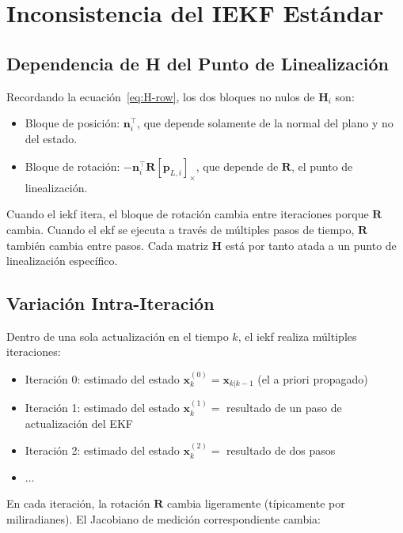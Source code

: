 \section{Inconsistencia del IEKF Estándar}
\label{sec:fej-inconsistencia}

\subsection{Dependencia de H del Punto de Linealización}
\label{sec:fej-dependencia-H}

Recordando la ecuación~\eqref{eq:H-row}, los dos bloques no nulos de $\mathbf{H}_i$
son:

\begin{itemize}
    \item Bloque de posición: $\mathbf{n}_i^\top$, que depende solamente de la
    normal del plano y no del estado.
    \item Bloque de rotación: $-\mathbf{n}_i^\top \mathbf{R} [\mathbf{p}_{L,i}]_\times$,
    que depende de $\mathbf{R}$, el punto de linealización.
\end{itemize}

Cuando el \gls{iekf} itera, el bloque de rotación cambia entre iteraciones porque
$\mathbf{R}$ cambia. Cuando el \gls{ekf} se ejecuta a través de múltiples pasos
de tiempo, $\mathbf{R}$ también cambia entre pasos. Cada matriz $\mathbf{H}$ está
por tanto atada a un punto de linealización específico.

\subsection{Variación Intra-Iteración}
\label{sec:fej-variacion-intra}

Dentro de una sola actualización en el tiempo $k$, el \gls{iekf} realiza
múltiples iteraciones:

\begin{itemize}
    \item Iteración 0: estimado del estado $\mathbf{x}_k^{(0)} = \mathbf{x}_{k|k-1}$ (el a priori propagado)
    \item Iteración 1: estimado del estado $\mathbf{x}_k^{(1)} =$ resultado de un paso de actualización del EKF
    \item Iteración 2: estimado del estado $\mathbf{x}_k^{(2)} =$ resultado de dos pasos
    \item $\dots$
\end{itemize}

En cada iteración, la rotación $\mathbf{R}$ cambia ligeramente (típicamente por
miliradianes). El Jacobiano de medición correspondiente cambia:

